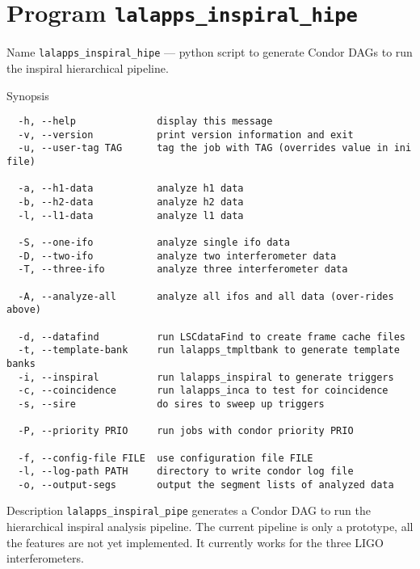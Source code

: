 \section{Program \texttt{lalapps\_inspiral\_hipe}}
\label{program:inspiral-hipe}

\begin{entry}
\item[Name]
\verb$lalapps_inspiral_hipe$ --- python script to generate Condor DAGs to
run the inspiral hierarchical pipeline.

\item[Synopsis]
\begin{verbatim}
  -h, --help              display this message
  -v, --version           print version information and exit
  -u, --user-tag TAG      tag the job with TAG (overrides value in ini file)
  
  -a, --h1-data           analyze h1 data
  -b, --h2-data           analyze h2 data
  -l, --l1-data           analyze l1 data
 
  -S, --one-ifo           analyze single ifo data
  -D, --two-ifo           analyze two interferometer data
  -T, --three-ifo         analyze three interferometer data
   
  -A, --analyze-all       analyze all ifos and all data (over-rides above)
 
  -d, --datafind          run LSCdataFind to create frame cache files
  -t, --template-bank     run lalapps_tmpltbank to generate template banks
  -i, --inspiral          run lalapps_inspiral to generate triggers
  -c, --coincidence       run lalapps_inca to test for coincidence
  -s, --sire              do sires to sweep up triggers
   
  -P, --priority PRIO     run jobs with condor priority PRIO
 
  -f, --config-file FILE  use configuration file FILE
  -l, --log-path PATH     directory to write condor log file
  -o, --output-segs       output the segment lists of analyzed data
\end{verbatim}

\item[Description] \verb$lalapps_inspiral_pipe$ generates a Condor DAG to run
the hierarchical inspiral analysis pipeline.  The current pipeline is only a
prototype, all the features are not yet implemented.  It currently works for
the three LIGO interferometers.  


\end{entry}
